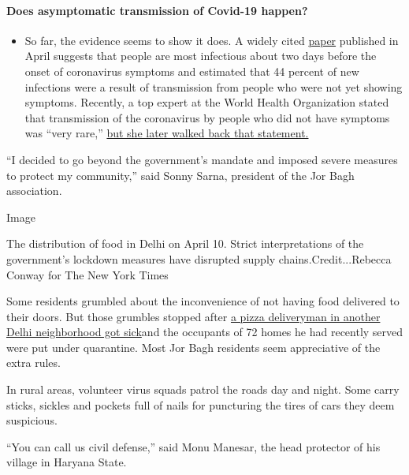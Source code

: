 \begin{itemize}
{  \paragraph{Does asymptomatic transmission of Covid-19
  happen?}\label{does-asymptomatic-transmission-of-covid-19-happen}}

  \begin{itemize}
  \tightlist
  \item
    So far, the evidence seems to show it does. A widely cited
    \href{https://www.nature.com/articles/s41591-020-0869-5}{paper}
    published in April suggests that people are most infectious about
    two days before the onset of coronavirus symptoms and estimated that
    44 percent of new infections were a result of transmission from
    people who were not yet showing symptoms. Recently, a top expert at
    the World Health Organization stated that transmission of the
    coronavirus by people who did not have symptoms was ``very rare,''
    \href{https://www.nytimes.com/2020/06/09/world/coronavirus-updates.html?action=click\&pgtype=Article\&state=default\&region=MAIN_CONTENT_3\&context=storylines_faq\#link-1f302e21}{but
    she later walked back that statement.}
  \end{itemize}
\end{itemize}

``I decided to go beyond the government's mandate and imposed severe
measures to protect my community,'' said Sonny Sarna, president of the
Jor Bagh association.

Image

The distribution of food in Delhi on April 10. Strict interpretations of
the government's lockdown measures have disrupted supply
chains.Credit...Rebecca Conway for The New York Times

Some residents grumbled about the inconvenience of not having food
delivered to their doors. But those grumbles stopped after
\href{https://indianexpress.com/article/cities/delhi/delhi-pizza-coronavirus-covid-19-6364606/}{a
pizza deliveryman in another Delhi neighborhood got sick}and the
occupants of 72 homes he had recently served were put under quarantine.
Most Jor Bagh residents seem appreciative of the extra rules.

In rural areas, volunteer virus squads patrol the roads day and night.
Some carry sticks, sickles and pockets full of nails for puncturing the
tires of cars they deem suspicious.

``You can call us civil defense,'' said Monu Manesar, the head protector
of his village in Haryana State.

